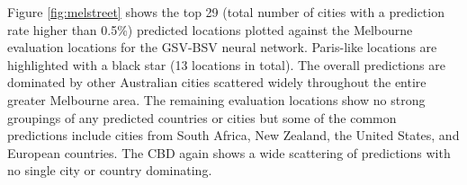 \documentclass[sageh,times]{sagej}
\begin{document}


Figure \ref{fig:melstreet} shows the top 29 (total number of cities with a prediction rate higher than 0.5\%) predicted locations plotted against the Melbourne evaluation locations for the GSV-BSV neural network. Paris-like locations are highlighted with a black star (13 locations in total). The overall predictions are dominated by other Australian cities scattered widely throughout the entire greater Melbourne area. The remaining evaluation locations show no strong groupings of any predicted countries or cities but some of the common predictions include cities from South Africa, New Zealand, the United States, and European countries. The CBD again shows a wide scattering of predictions with no single city or country dominating.

\end{document}

